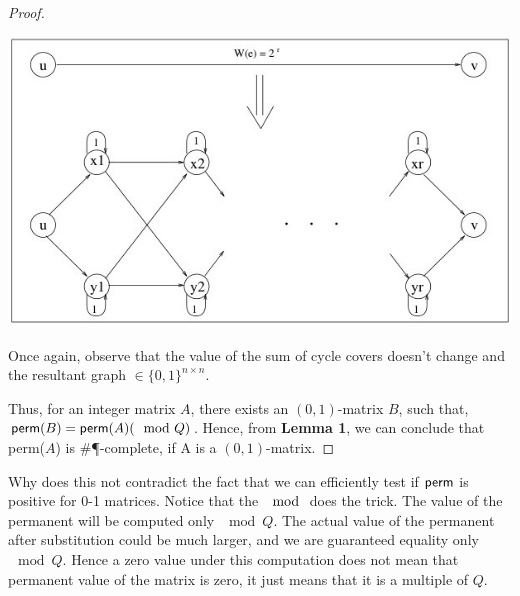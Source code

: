 \documentclass[11pt]{article}
\newcommand{\perm}{{\sf perm}}
\begin{document}
\begin{proof}
\begin{enumerate}
\begin{center}
            \includegraphics[scale=.6]{reduction2.jpg}
            \end{center}
            Once again, observe that the value of the sum of cycle covers doesn't change and the resultant graph $\in \{ 0, 1\}^{n \times n}$.
    \end{enumerate}
    Thus, for an integer matrix $A$, there exists an $(0,1)$-matrix $B$, such that, $\perm(B) = \perm(A) (\mod Q)$. Hence, from {\bf Lemma 1}, we can conclude that \perm($A$) is \#\P-complete, if A is a $(0,1)$-matrix.
    \end{proof}
        \begin{remark}
		Why does this not contradict the fact that we can efficiently test if $\perm$ is positive for 0-1 matrices. Notice that the $\mod$ does the trick. The value of the permanent will be computed only $\mod Q$. The actual value of the permanent after substitution could be much larger, and we are guaranteed equality only $\mod Q$. Hence a zero value under this computation does not mean that permanent value of the matrix is zero, it just means that it is a multiple of $Q$.
        \end{remark}
\end{document}
